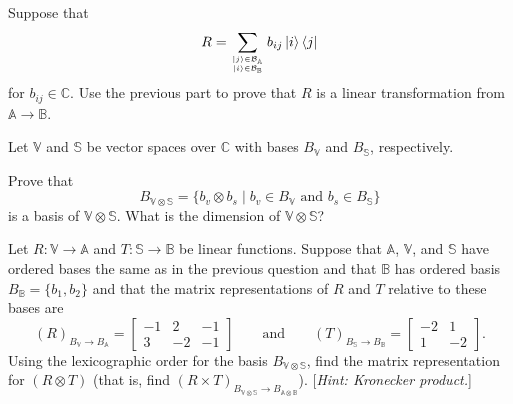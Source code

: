 \documentclass[oneside]{amsart}  %
\newcommand{\CC}{\mathbb{C}}
\newcommand{\m}[1]{\mathbb{#1}}      %
\newcommand{\alg}[1]{\m{#1}}         %
\newcommand{\cl}[1]{\mathcal{#1}}    %
\theoremstyle{plain}
\theoremstyle{definition}
\theoremstyle{remark}
\newcommand{\bmat}[1]{ \begin{bmatrix} #1 \end{bmatrix} }
\newcommand{\stack}[2]{\genfrac{}{}{0pt}{}{#1}{#2}}
\numberwithin{equation}{section}  %
\newcommand{\bra}[1]{ \left< #1 \right| }
\newcommand{\ket}[1]{ \left| #1 \right> }
\begin{document}
\begin{questions}
\begin{questions}
  \item Suppose that
  \[
    R
    = \sum_{\stack{ \ket{j}\in \cl{B}_{\alg{A}} }{ \ket{i}\in \cl{B}_{\alg{B}} }}
      b_{ij} \ket{i}\bra{j}
  \]
  for $b_{ij}\in \CC$. Use the previous part to prove that $R$ is a linear
  transformation from $\alg{A}\to \alg{B}$.
\end{questions}

\item Let $\m{V}$ and $\m{S}$ be vector spaces over $\CC$ with bases $B_{\m{V}}$
and $B_{\m{S}}$, respectively. 

\begin{questions}
  \item Prove that
  \[
    B_{\m{V}\otimes \m{S}}
    = \big\{ b_v \otimes b_s \mid b_v\in B_{\m{V}} \text{ and } b_s\in
      B_{\m{S}} \big\}
  \]
  is a basis of $\m{V}\otimes \m{S}$. What is the dimension of $\m{V}\otimes
  \m{S}$?

  \item Let $R: \m{V} \to \m{A}$ and $T:\m{S}\to \m{B}$ be linear functions.
  Suppose that $\m{A}$, $\m{V}$, and $\m{S}$ have ordered bases the same as in
  the previous question and that $\m{B}$ has ordered basis $B_{\m{B}} = \big\{
  b_1, b_2 \big\}$ and that the matrix representations of $R$ and $T$ relative
  to these bases are
  \[
    (R)_{B_{\m{V}}\to B_{\m{A}} }
      = \bmat{ -1 &  2 & -1 \\
                3 & -2 & -1 }
    \qquad\text{and}\qquad
    (T)_{B_{\m{S}}\to B_{\m{B}} }
      = \bmat{ -2 &  1 \\
                1 & -2 }.
  \]
  Using the lexicographic order for the basis $B_{\m{V}\otimes \m{S}}$, find the
  matrix representation for $(R\otimes T)$ (that is, find $(R\times
  T)_{B_{\m{V}\otimes \m{S}}\to B_{\m{A}\otimes \m{B}} }$). [\emph{Hint:
  Kronecker product.}]
\end{questions}
\end{questions} 
\end{document}

